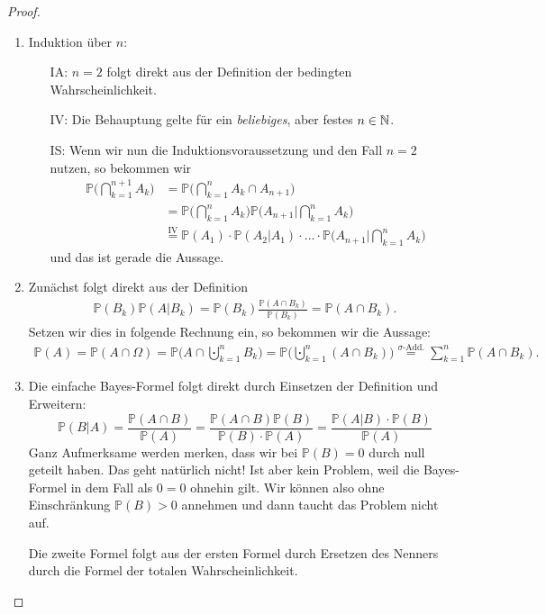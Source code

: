 \begin{proof}
	\begin{enumerate}[label=(\roman*)]
		\item Induktion über $n$:
		\begin{itemize}
			\item[IA:] $n=2$ folgt direkt aus der Definition der bedingten Wahrscheinlichkeit.
			\item[IV:] \label{IVmult} Die Behauptung gelte für ein \textit{beliebiges}, aber festes $n \in \mathbb{N}$.
			\item[IS:] Wenn wir nun die Induktionsvoraussetzung und den Fall $n=2$ nutzen, so bekommen wir 
			\begin{align*}
				\mathbb{P}\Big(\bigcap_{k=1}^{n+1} A_k\Big) &= \mathbb{P}\Big(\bigcap_{k=1}^{n} A_k\cap A_{n+1}\Big)\\
				& = \mathbb{P}\Big(\bigcap_{k=1}^{n} A_k\Big) \mathbb{P}\Big(A_{n+1}\Big |\bigcap_{k=1}^{n} A_k\Big)\\
				& \overset{\text{IV}}{=} \mathbb{P}(A_1)\cdot \mathbb{P}(A_2|A_1)\cdot ... \cdot \mathbb{P}\Big(A_{n+1}\Big|\bigcap_{k=1}^{n} A_k\Big)
			\end{align*}
			und das ist gerade die Aussage.
		\end{itemize}
		\item 
		Zun\"achst folgt direkt aus der Definition
		\begin{align*}
			\mathbb{P}(B_k)\mathbb{P}(A|B_k) = \mathbb{P}(B_k) \frac{\mathbb{P}(A \cap B_k)}{\mathbb{P}(B_k)} = \mathbb{P}(A \cap B_k).
		\end{align*}
		Setzen wir dies in folgende Rechnung ein, so bekommen wir die Aussage:
		\begin{align*}
			\mathbb{P}(A) = \mathbb{P}(A \cap \Omega) = \mathbb{P}\Big(A \cap \bigcupdot_{k=1}^{n} B_k\Big) = \mathbb{P}\Big(\bigcupdot_{k=1}^{n} (A \cap B_k)\Big)
			\overset{\sigma\text{-Add.}}{=} \sum\limits_{k=1}^{n} \mathbb{P}(A \cap B_k).
		\end{align*}
		\item Die einfache Bayes-Formel folgt direkt durch Einsetzen der Definition und Erweitern:
		\[ \mathbb{P}(B|A) = \frac{\mathbb{P}(A \cap B)}{\mathbb{P}(A)} = \frac{\mathbb{P}(A \cap B) \mathbb{P}(B)}{\mathbb{P}(B) \cdot \mathbb{P}(A)} =\frac{\mathbb{P}(A|B) \cdot \mathbb{P}(B)}{\mathbb{P}(A)} \]
		Ganz Aufmerksame werden merken, dass wir bei $\mathbb P(B)=0$ durch null geteilt haben. Das geht nat\"urlich nicht! Ist aber kein Problem, weil die Bayes-Formel in dem Fall als $0=0$ ohnehin gilt. Wir k\"onnen also ohne Einschr\"ankung $\mathbb P(B)>0$ annehmen und dann taucht das Problem nicht auf.\smallskip

		Die zweite Formel folgt aus der ersten Formel durch Ersetzen des Nenners durch die Formel der totalen Wahrscheinlichkeit. 
	\end{enumerate}
\end{proof}
